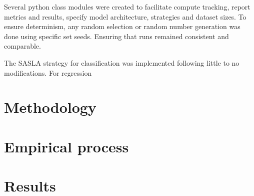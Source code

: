 \documentclass[conference]{IEEEtran}
\begin{document}
Several python class modules were created to facilitate compute tracking, report metrics and results, specify model architecture, strategies and dataset sizes. To ensure determinism, any random selection or random number generation was done using specific set seeds. Ensuring that runs remained consistent and comparable. 

The SASLA strategy for classification was implemented following %
little to no modifications. For regression
\section*{Methodology}
% 

\section*{Empirical process}

\section*{Results}
% 
\end{document}
